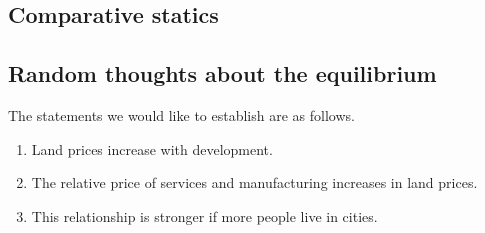 \documentclass[12pt]{article}
\begin{document}
\subsection{Comparative statics}

\subsection{Random thoughts about the equilibrium}
The statements we would like to establish are as follows.

\begin{enumerate}
  \item Land prices increase with development.
  \item The relative price of services and manufacturing increases in land prices.
  \item This relationship is stronger if more people live in cities.
\end{enumerate}
\end{document}

